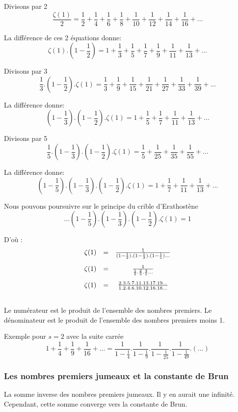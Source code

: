 Divisons par 2
\[ \frac{\zeta(1)}{2} = \frac{1}{2}+\frac{1}{4}+\frac{1}{6}+\frac{1}{8}+\frac{1}{10}+\frac{1}{12} + \frac{1}{14}+ \frac{1}{16}+... \]
 
La différence de ces 2 équations donne:
\[ \zeta(1).(1-\frac{1}{2}) = 1 + \frac{1}{3}+\frac{1}{5}+\frac{1}{7}+\frac{1}{9}+\frac{1}{11}+\frac{1}{13}+ ... \]

Divisons par 3
\[ \frac{1}{3}.(1-\frac{1}{2}).\zeta(1) = \frac{1}{3} + \frac{1}{9}+\frac{1}{15}+\frac{1}{21}+\frac{1}{27}+ \frac{1}{33}+ \frac{1}{39}+... \]

La différence donne:
\[ (1-\frac{1}{3}).(1-\frac{1}{2}).\zeta(1) = 1 + \frac{1}{5} + \frac{1}{7}+\frac{1}{11}+\frac{1}{13}+ ... \]

Divisons par 5
\[ \frac{1}{5}.(1-\frac{1}{3}).(1-\frac{1}{2}).\zeta(1) =    \frac{1}{5} + \frac{1}{25}+\frac{1}{35}+\frac{1}{55}+ ... \]

La différence donne:
\[(1-\frac{1}{5}).(1-\frac{1}{3}).(1-\frac{1}{2}).\zeta(1) = 1 + \frac{1}{7}+\frac{1}{11}+\frac{1}{13}+... \]

Nous pouvons poursuivre sur le principe du crible d'Erathostène
\[ \ldots(1-\frac{1}{5}).(1-\frac{1}{3}).(1-\frac{1}{2}).\zeta(1) = 1 \]

D'où :
$$
\begin{array}{ccc}
\zeta(1) &=& \frac{1}{(1-\frac{1}{2}).(1-\frac{1}{3}).(1-\frac{1}{5})\ldots} \\[\bigskipamount]
\zeta(1) &=& \frac{1}{\frac{1}{2}.\frac{2}{3}.\frac{4}{5}\ldots} 		\\[\bigskipamount]
\zeta(1) &=&  \frac{2.3.5.7.11.13.17.19...}{1.2.4.6.10.12.16.18...} \\[\bigskipamount]
\end{array}
$$

Le numérateur est le produit de l'ensemble des nombres premiers.
Le dénominateur est le produit de l'ensemble des nombres premiers moins 1.


Exemple pour $s=2$ avec la suite carrée
\[ 1+ \frac{1}{4} + \frac{1}{9} + \frac{1}{16} + ...  =  \frac{1}{1-\frac{1}{4}} .\frac{1}{1-\frac{1}{9}}.\frac{1}{1-\frac{1}{25}}.\frac{1}{1-\frac{1}{49}}. (...) \]



\subsubsection{Les nombres premiers jumeaux et la constante de Brun}
La somme inverse des nombres premiers jumeaux. Il y en aurait une infinité. Cependant, cette somme
 converge vers la constante de Brun.



